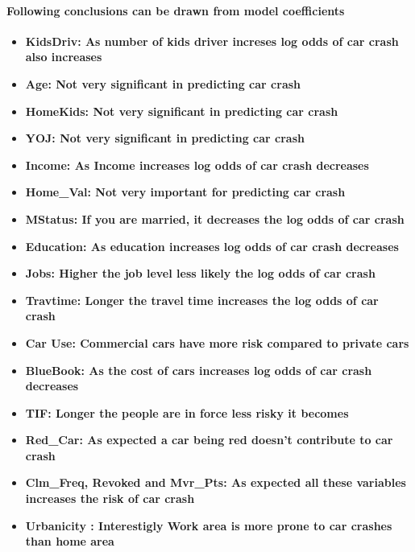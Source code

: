 \documentclass[]{article}
\providecommand{\tightlist}{%
  \setlength{\itemsep}{0pt}\setlength{\parskip}{0pt}}
\let\oldparagraph\paragraph
\renewcommand{\paragraph}[1]{\oldparagraph{#1}\mbox{}}
\begin{document}
\hypertarget{following-conclusions-can-be-drawn-from-model-coefficients}{%
\paragraph{\texorpdfstring{\textbf{Following conclusions can be drawn
from model
coefficients}}{Following conclusions can be drawn from model coefficients}}\label{following-conclusions-can-be-drawn-from-model-coefficients}}

\begin{itemize}
\tightlist
\item
  \textbf{KidsDriv: As number of kids driver increses log odds of car
  crash also increases}
\item
  \textbf{Age: Not very significant in predicting car crash}
\item
  \textbf{HomeKids: Not very significant in predicting car crash}
\item
  \textbf{YOJ: Not very significant in predicting car crash}
\item
  \textbf{Income: As Income increases log odds of car crash decreases}
\item
  \textbf{Home\_Val: Not very important for predicting car crash}
\item
  \textbf{MStatus: If you are married, it decreases the log odds of car
  crash}
\item
  \textbf{Education: As education increases log odds of car crash
  decreases}
\item
  \textbf{Jobs: Higher the job level less likely the log odds of car
  crash}
\item
  \textbf{Travtime: Longer the travel time increases the log odds of car
  crash}
\item
  \textbf{Car Use: Commercial cars have more risk compared to private
  cars}
\item
  \textbf{BlueBook: As the cost of cars increases log odds of car crash
  decreases}
\item
  \textbf{TIF: Longer the people are in force less risky it becomes}
\item
  \textbf{Red\_Car: As expected a car being red doesn't contribute to
  car crash}
\item
  \textbf{Clm\_Freq, Revoked and Mvr\_Pts: As expected all these
  variables increases the risk of car crash}
\item
  \textbf{Urbanicity : Interestigly Work area is more prone to car
  crashes than home area}
\end{itemize}
\end{document}
